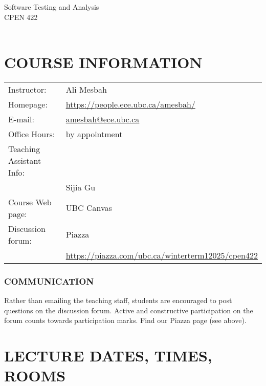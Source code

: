 \documentclass [11pt]{article}
\begin{document}
   \begin{center}

     {\bighelv   Software Testing and Analysis} \\
     {\mediumhelv CPEN 422} \\
     \ \\

       
    
   \end{center}

   

	

	\section*{COURSE INFORMATION}
	
	\begin{tabular}{l l}
      Instructor:  & Ali Mesbah\\
      Homepage: & \url{https://people.ece.ubc.ca/amesbah/} \\
      E-mail: & \url{amesbah@ece.ubc.ca}  \\
	  Office Hours:  & by appointment \\
	  
	  Teaching Assistant Info: & \\
	  
	  & Sijia Gu\\
	  	 
	  Course Web page: & UBC Canvas\\
	  Discussion forum: & Piazza \\ 
	  & \url{https://piazza.com/ubc.ca/winterterm12025/cpen422}\\

  \end{tabular}
	


\subsubsection*{COMMUNICATION}

Rather than emailing the teaching staff, students are encouraged to post questions on the discussion forum. Active and constructive participation on the forum counts towards participation marks.
Find our Piazza page (see above).


\section*{LECTURE DATES, TIMES, ROOMS}
\end{document}
